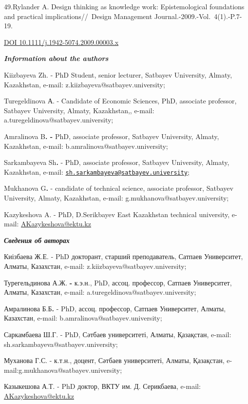 49.Rylander A. Design thinking as knowledge work: Epistemological
foundations and practical implications//~Design Management
Journal.-2009.-Vol.~4(1).-P.7-19.

\href{https://doi.org/10.1111/j.1942-5074.2009.00003.x}{DOI
10.1111/j.1942-5074.2009.00003.x}

\emph{{\bfseries Information about the authors}}

Kiizbayeva Zh. - PhD Student, senior lecturer, Satbayev University,
Almaty, Kazakhstan, e-mail: z.kiizbayeva@satbayev.university;

Turegeldinova А. - Candidate of Economic Sciences, PhD, associate
professor, Satbayev University, Almaty, Kazakhstan,, e-mail:
a.turegeldinova@satbayev.university;

Amralinova B{\bfseries . -} PhD, associate professor, Satbayev University,
Almaty, Kazakhstan, e-mail: b.amralinova@satbayev.university;

Sarkambayeva Sh{\bfseries .} - PhD, associate professor, Satbayev
University, Almaty, Kazakhstan, e-mail:
\href{mailto:sh.sarkambayeva@satbayev.university}{\nolinkurl{sh.sarkambayeva@satbayev.university}};

Mukhanova G{\bfseries .} - candidate of technical science, associate
professor, Satbayev University, Almaty, Kazakhstan, e-mail:
g.mukhanova@satbayev.university;

Kazykeshova A. - PhD, D.Serikbayev East Kazakhstan technical university,
e-mail: \href{mailto:zh.serikbayeva@almau.edu.kz}{AKazykeshova@ektu.kz}

\emph{{\bfseries Сведения об авторах}}

Киізбаева Ж.Е. - PhD докторант, старший преподаватель, Сатпаев
Университет, Алматы, Казахстан, e-mail:
z.kiizbayeva@satbayev.university;

Турегельдинова А.Ж. {\bfseries -} к.э.н., PhD, ассоц. профессор, Сатпаев
Университет, Алматы, Казахстан, e-mail:
a.turegeldinova@satbayev.university;

Амралинова Б.Б{\bfseries .} - PhD, ассоц. профессор, Сатпаев Университет,
Алматы, Казахстан, e-mail: b.amralinova@satbayev.university;

Саркамбаева Ш.Г. - PhD, Сәтбаев университеті, Алматы, Қазақстан, e-mail:
sh.sarkambayeva@satbayev.university;

Муханова Г.С. - к.т.н., доцент, Сәтбаев университеті, Алматы, Қазақстан,
e-mail:g.mukhanova@satbayev.university;

Казыкешова А.Т. - PhD доктор, ВКТУ им. Д. Серикбаева, e-mail:
\href{mailto:zh.serikbayeva@almau.edu.kz}{AKazykeshova@ektu.kz}

